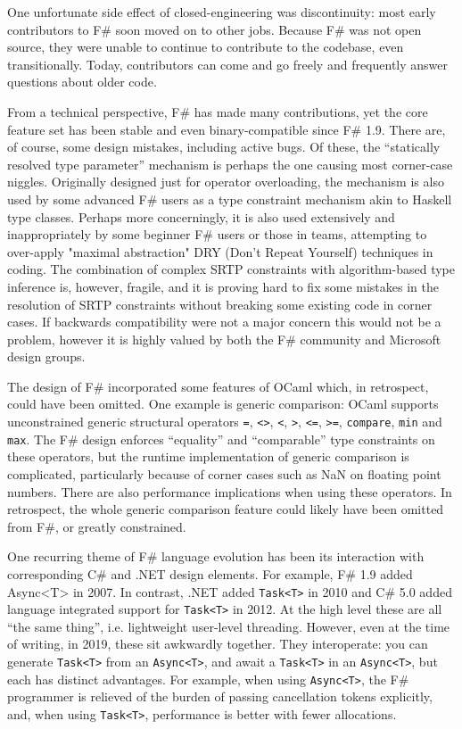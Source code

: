 \documentclass[acmsmall,screen]{acmart}
\begin{document}
One unfortunate side effect of closed-engineering was discontinuity: most early
contributors to F\# soon moved on to other jobs. Because F\# was not open source, they
were unable to continue to contribute to the codebase, even transitionally. Today, contributors
can come and go freely and frequently answer questions about older code.

From a technical perspective, F\# has made many contributions, yet the core feature set has
been stable and even binary-compatible since F\# 1.9.  There are, of course, some
design mistakes, including active bugs.  Of these, the “statically resolved type parameter”
mechanism is perhaps the one causing most corner-case niggles. Originally designed just for
operator overloading, the mechanism is also used by some advanced F\# users as a type constraint
mechanism akin to Haskell type classes. Perhaps more concerningly, it is also used extensively
and inappropriately by some beginner F\# users or those in teams, attempting to
over-apply "maximal abstraction" DRY (Don't Repeat Yourself) techniques in coding.   The combination of complex SRTP constraints
with algorithm-based type inference is, however, fragile, and it is proving hard to fix some
mistakes in the resolution of SRTP constraints without breaking some existing code in
corner cases.  If backwards compatibility were not a major concern this would not be
a problem, however it is highly valued by both the F\# community and Microsoft design groups.

The design of F\# incorporated some features of OCaml which, in retrospect, could have
been omitted.  One example is generic comparison: OCaml supports unconstrained generic
structural operators \texttt{=}, \texttt{<>}, \texttt{<}, \texttt{>}, \texttt{<=}, \texttt{>=}, \texttt{compare}, \texttt{min} and \texttt{max}.
The F\# design enforces “equality” and “comparable” type constraints on these operators, but the runtime
implementation of generic comparison is complicated, particularly because of corner cases
such as NaN on floating point numbers. There are also performance implications when
using these operators. In retrospect, the whole generic comparison feature could likely
have been omitted from F\#, or greatly constrained.

One recurring theme of F\# language evolution has been its interaction with corresponding
C\# and .NET design elements.  For example, F\# 1.9 added Async<T> in 2007.  In
contrast, .NET added \texttt{Task<T>} in 2010 and C\# 5.0 added language integrated support for \texttt{Task<T>} in
2012.  At the high level these are all “the same thing”, i.e. lightweight user-level threading. However,
even at the time of writing, in 2019, these sit awkwardly together. They interoperate:
you can generate \texttt{Task<T>} from an \texttt{Async<T>}, and await a \texttt{Task<T>} in an \texttt{Async<T>}, but
each has distinct advantages. For example, when using \texttt{Async<T>}, the F\# programmer is relieved of the burden of
passing cancellation tokens explicitly, and, when using \texttt{Task<T>}, performance is better with fewer allocations.  
\end{document}

